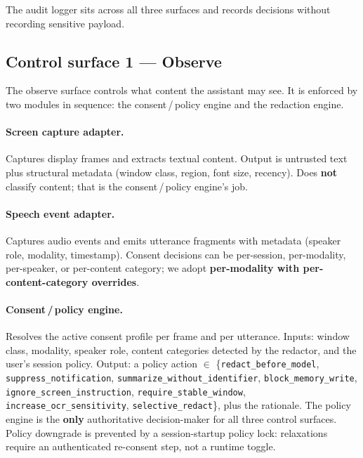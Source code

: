 \documentclass[sn-mathphys-num]{sn-jnl}
\begin{document}
The audit logger sits across all three surfaces and records decisions without
recording sensitive payload.

\subsection{Control surface 1 --- Observe}\label{sec:observe}

The observe surface controls what content the assistant may see. It is enforced
by two modules in sequence: the consent\,/\,policy engine and the redaction
engine.

\paragraph{Screen capture adapter.}
Captures display frames and extracts textual content. Output is untrusted text
plus structural metadata (window class, region, font size, recency). Does
\textbf{not} classify content; that is the consent\,/\,policy engine's job.

\paragraph{Speech event adapter.}
Captures audio events and emits utterance fragments with metadata (speaker
role, modality, timestamp). Consent decisions can be per-session,
per-modality, per-speaker, or per-content category; we adopt \textbf{per-modality
with per-content-category overrides}.

\paragraph{Consent\,/\,policy engine.}
Resolves the active consent profile per frame and per utterance. Inputs: window
class, modality, speaker role, content categories detected by the redactor, and
the user's session policy. Output: a policy action $\in$
\{\texttt{redact\_before\_model}, \texttt{suppress\_notification},
\texttt{summarize\_without\_identifier}, \texttt{block\_memory\_write},
\texttt{ignore\_screen\_instruction}, \texttt{require\_stable\_window},
\texttt{increase\_ocr\_sensitivity}, \texttt{selective\_redact}\}, plus the
rationale. The policy engine is the \textbf{only} authoritative decision-maker
for all three control surfaces. Policy downgrade is prevented by a
session-startup policy lock: relaxations require an authenticated re-consent
step, not a runtime toggle.
\end{document}
